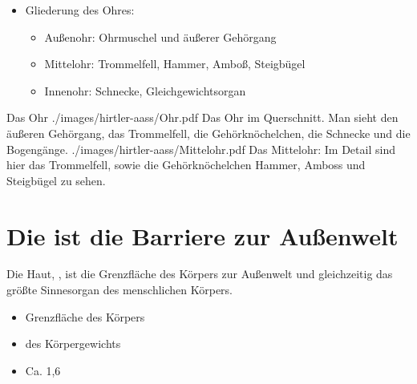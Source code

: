{%
\begin{itemize}
  \item Gliederung des Ohres:
  \begin{itemize}
    \item Außenohr: Ohrmuschel und äußerer Gehörgang
    \item Mittelohr: Trommelfell, Hammer, Amboß, Steigbügel
    \item Innenohr: Schnecke, Gleichgewichtsorgan
  \end{itemize}
\end{itemize}
}{}{}{}

\begin{PictureSeries}{}{Das Ohr}
{./images/hirtler-aass/Ohr.pdf}
{Das Ohr im Querschnitt. Man sieht
den äußeren Gehörgang, das
Trommelfell, die Gehörknöchelchen,
die Schnecke und die Bogengänge. }
{./images/hirtler-aass/Mittelohr.pdf} {Das Mittelohr: Im Detail sind hier
das Trommelfell, sowie die Gehörknöchelchen Hammer, Amboss
und Steigbügel zu sehen.
}
{}
{}
{}
{}
\end{PictureSeries}



\section{Die  ist die Barriere zur Außenwelt}
\label{topic:haut}

\TextSlide
{{\TxBeschreibung}}%
{Die Haut,  , ist die Grenzfläche des Körpers zur
Außenwelt und gleichzeitig das größte Sinnesorgan des
menschlichen Körpers.
}%
{%
\begin{itemize}
  \item Grenzfläche des Körpers
  \item {} des Körpergewichts
  \item Ca. 1,6\Meter*{\texttwosuperior}
\end{itemize}
}%




